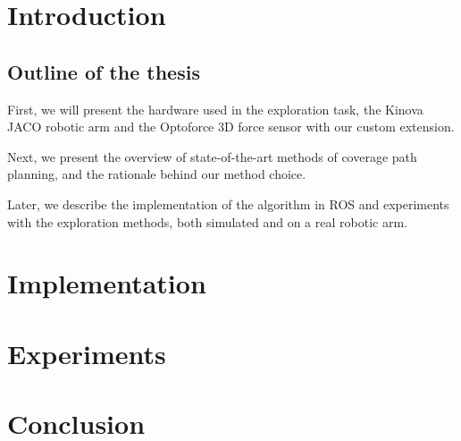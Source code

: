 \documentclass[twoside]{ctuthesis}
\theoremstyle{plain}
\theoremstyle{definition}
\theoremstyle{note}
\begin{document}
\maketitle

\chapter{Introduction}
\label{chap:intro}

\section{Outline of the thesis}
\label{sec:outline}

First, we will present the hardware used in the exploration task, the Kinova JACO robotic arm and the Optoforce 3D force sensor with our custom extension.

Next, we present the overview of state-of-the-art methods of coverage path planning, and the rationale behind our method choice.

Later, we describe the implementation of the algorithm in ROS and experiments with the exploration methods, both simulated and on a real robotic arm.











\chapter{Implementation}



\chapter{Experiments}



\chapter{Conclusion}


\appendix




\end{document}
